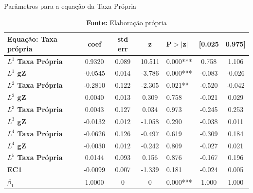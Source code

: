 \begin{center}
	\begin{table}[H]
		\centering
		\caption{Parâmetros para a equação da Taxa Própria}
	\begin{tabular}{lccclcc}
		\toprule
		\textbf{Equação:} Taxa própria & \textbf{coef} & \textbf{std err} & \textbf{z} & \textbf{P$> |$z$|$} & \textbf{[0.025} & \textbf{0.975]}  \\
		\midrule
		\textbf{$L^1 $ Taxa Própria} &       0.9320  &        0.089     &    10.511  &         0.000***        &        0.758    &        1.106     \\
		\textbf{$L^1 $ gZ}           &      -0.0545  &        0.014     &    -3.786  &         0.000***        &       -0.083    &       -0.026     \\
		\textbf{$L^2 $ Taxa Própria} &      -0.2810  &        0.122     &    -2.305  &         0.021**        &       -0.520    &       -0.042     \\
		\textbf{$L^2 $ gZ}           &       0.0040  &        0.013     &     0.309  &         0.758        &       -0.021    &        0.029     \\
		\textbf{$L^3 $ Taxa Própria} &       0.0043  &        0.127     &     0.034  &         0.973        &       -0.245    &        0.253     \\
		\textbf{$L^3 $ gZ}           &      -0.0132  &        0.012     &    -1.058  &         0.290        &       -0.038    &        0.011     \\
		\textbf{$L^4 $ Taxa Própria} &      -0.0626  &        0.126     &    -0.497  &         0.619        &       -0.309    &        0.184     \\
		\textbf{$L^4 $ gZ}           &      -0.0030  &        0.012     &    -0.242  &         0.809        &       -0.027    &        0.021     \\
		\textbf{$L^5 $ Taxa Própria} &       0.0144  &        0.093     &     0.156  &         0.876        &       -0.167    &        0.196     \\
		\textbf{EC1} &      -0.0099  &        0.007     &    -1.339  &         0.181        &       -0.024    &        0.005     \\
		\textbf{$\beta_1$ } &       1.0000  &            0     &         0  &         0.000***        &        1.000    &        1.000     \\\bottomrule
	\end{tabular}
\caption*{\textbf{Fonte:} Elaboração própria}
\end{table}
\end{center}
	

